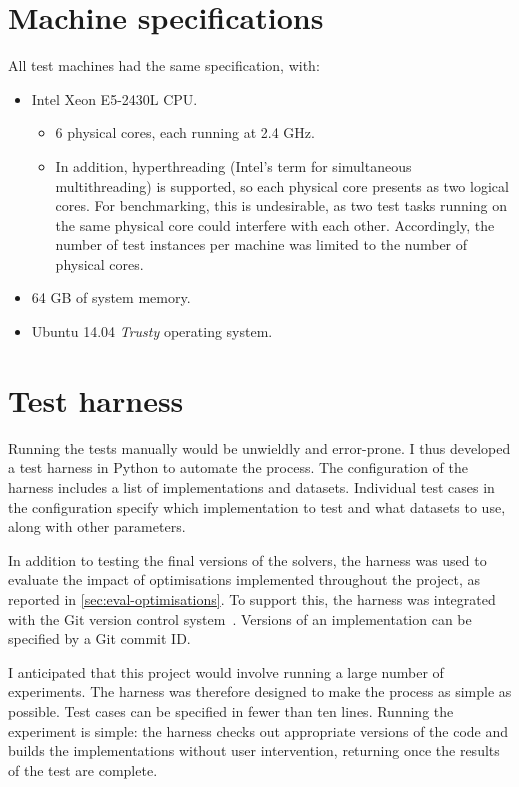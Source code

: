 \section{Machine specifications} \label{appendix:test-machine-spec}

All test machines had the same specification, with:
\begin{itemize}
    \item Intel Xeon E5-2430L CPU.
    \begin{itemize}
        \item 6 physical cores, each running at 2.4 GHz.
        \item In addition, hyperthreading (Intel's term for simultaneous multithreading) is supported, so each physical core presents as two logical cores. For benchmarking, this is undesirable, as two test tasks running on the same physical core could interfere with each other. Accordingly, the number of test instances per machine was limited to the number of physical cores.
    \end{itemize}
    \item 64 GB of system memory.
    \item Ubuntu 14.04 \textit{Trusty} operating system.
\end{itemize}

\section{Test harness} \label{appendix:impl-benchmark-harness}

Running the tests manually would be unwieldly and error-prone. I thus developed a test harness in Python to automate the process. The configuration of the harness includes a list of implementations and datasets. Individual test cases in the configuration specify which implementation to test and what datasets to use, along with other parameters.

In addition to testing the final versions of the solvers, the harness was used to evaluate the impact of optimisations implemented throughout the project, as reported in \cref{sec:eval-optimisations}. To support this, the harness was integrated with the Git version control system~\cite{GitWWW}. Versions of an implementation can be specified by a Git commit ID.

I anticipated that this project would involve running a large number of experiments. The harness was therefore designed to make the process as simple as possible. Test cases can be specified in fewer than ten lines. Running the experiment is simple: the harness checks out appropriate versions of the code and builds the implementations without user intervention, returning once the results of the test are complete.

